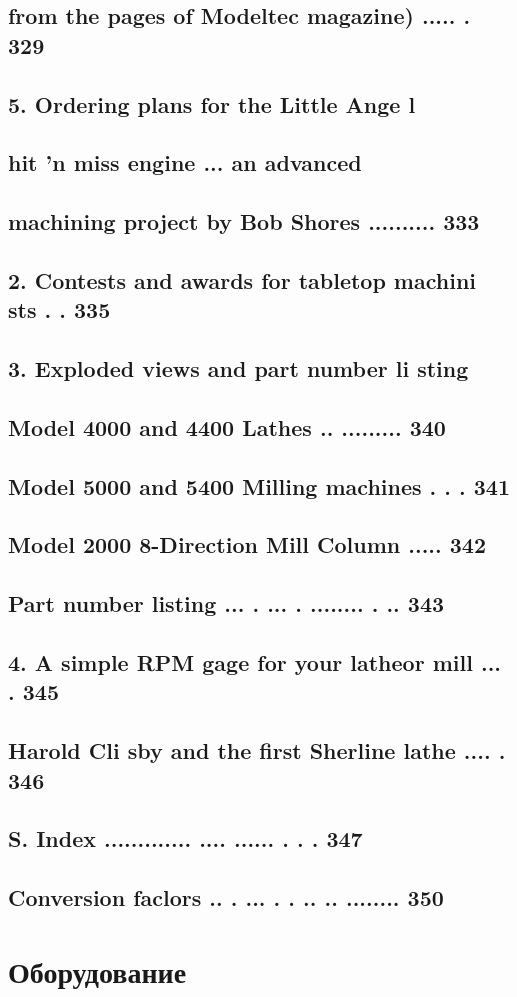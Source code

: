 \section{from the pages of Modeltec magazine) ..... . 329}
\section{5. Ordering plans for the Little Ange l}
\section{hit 'n miss engine ... an advanced}
\section{machining project by Bob Shores .......... 333}
\section{2. Contests and awards for tabletop machini sts . . 335}
\section{3. Exploded views and part number li sting}
\section{ Model 4000 and 4400 Lathes .. ......... 340}
\section{ Model 5000 and 5400 Milling machines . . . 341}
\section{ Model 2000 8-Direction Mill Column ..... 342}
\section{ Part number listing ... . ... . ........ . .. 343}
\section{4. A simple RPM gage for your latheor mill ... . 345}
\section{Harold Cli sby and the first Sherline lathe .... . 346}
\section{S. Index ............. .... ...... . . . 347}
\section{ Conversion faclors .. . ... . . .. .. ........ 350}

\chapter{Оборудование}

